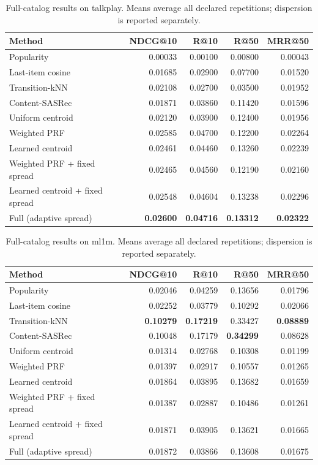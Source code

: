 \begin{table}[t]
\centering\scriptsize
\begin{tabular}{lrrrr}
\toprule
Method & NDCG@10 & R@10 & R@50 & MRR@50 \\
\midrule
Popularity & 0.00033 & 0.00100 & 0.00800 & 0.00043 \\
Last-item cosine & 0.01685 & 0.02900 & 0.07700 & 0.01520 \\
Transition-kNN & 0.02108 & 0.02700 & 0.03500 & 0.01952 \\
Content-SASRec & 0.01871 & 0.03860 & 0.11420 & 0.01596 \\
Uniform centroid & 0.02120 & 0.03900 & 0.12400 & 0.01956 \\
Weighted PRF & 0.02585 & 0.04700 & 0.12200 & 0.02264 \\
Learned centroid & 0.02461 & 0.04460 & 0.13260 & 0.02239 \\
Weighted PRF + fixed spread & 0.02465 & 0.04560 & 0.12190 & 0.02160 \\
Learned centroid + fixed spread & 0.02548 & 0.04604 & 0.13238 & 0.02296 \\
Full (adaptive spread) & \textbf{0.02600} & \textbf{0.04716} & \textbf{0.13312} & \textbf{0.02322} \\
\bottomrule
\end{tabular}
\caption{Full-catalog results on talkplay. Means average all declared repetitions; dispersion is reported separately.}
\label{tab:ecir-results-talkplay}
\end{table}

\begin{table}[t]
\centering\scriptsize
\begin{tabular}{lrrrr}
\toprule
Method & NDCG@10 & R@10 & R@50 & MRR@50 \\
\midrule
Popularity & 0.02046 & 0.04259 & 0.13656 & 0.01796 \\
Last-item cosine & 0.02252 & 0.03779 & 0.10292 & 0.02066 \\
Transition-kNN & \textbf{0.10279} & \textbf{0.17219} & 0.33427 & \textbf{0.08889} \\
Content-SASRec & 0.10048 & 0.17179 & \textbf{0.34299} & 0.08628 \\
Uniform centroid & 0.01314 & 0.02768 & 0.10308 & 0.01199 \\
Weighted PRF & 0.01397 & 0.02917 & 0.10557 & 0.01265 \\
Learned centroid & 0.01864 & 0.03895 & 0.13682 & 0.01659 \\
Weighted PRF + fixed spread & 0.01387 & 0.02887 & 0.10486 & 0.01261 \\
Learned centroid + fixed spread & 0.01871 & 0.03905 & 0.13621 & 0.01665 \\
Full (adaptive spread) & 0.01872 & 0.03866 & 0.13608 & 0.01675 \\
\bottomrule
\end{tabular}
\caption{Full-catalog results on ml1m. Means average all declared repetitions; dispersion is reported separately.}
\label{tab:ecir-results-ml1m}
\end{table}

